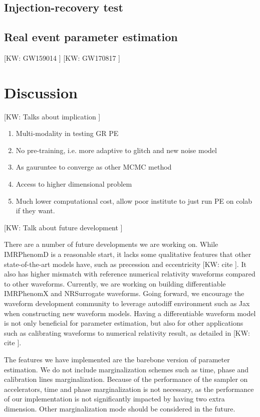 \documentclass[twocolumn]{aastex631}
\newcommand{\kw}[1]{{\color{rb4}[KW: #1 ]}}
\begin{document}
\subsection{Injection-recovery test}

\subsection{Real event parameter estimation}

\kw{GW159014}
\kw{GW170817}

\section{Discussion}
\label{sec: Discussion}

\kw{Talks about implication}
\begin{enumerate}
    \item Multi-modality in testing GR PE
    \item No pre-training, i.e. more adaptive to glitch and new noise model
    \item As gauruntee to converge as other MCMC method
    \item Access to higher dimensional problem
    \item Much lower computational cost, allow poor institute to just run PE on colab if they want.
\end{enumerate}

\kw{Talk about future development}


There are a number of future developments we are working on. While IMRPhenomD is
a reasonable start, it lacks some qualitative features that other
state-of-the-art models have, such as precession and eccentricity \kw{cite}. It
also has higher mismatch with reference numerical relativity waveforms compared
to other waveforms. Currently, we are working on building differentiable
IMRPhenomX and NRSurrogate waveforms. Going forward, we encourage the waveform
development community to leverage autodiff environment such as Jax when
constructing new waveform models. Having a differentiable waveform model is not
only beneficial for parameter estimation, but also for other applications such
as calibrating waveforms to numerical relativity result, as detailed in
\kw{cite}.


The features we have implemented are the barebone version of parameter
estimation. We do not include marginalization schemes such as time, phase and
calibration lines marginalization. Because of the performance of the sampler on
accelerators, time and phase marginalization is not necessary, as the
performance of our implementation is not significantly impacted by having two
extra dimension. Other marginalization mode should be considered in the future.
\end{document}
